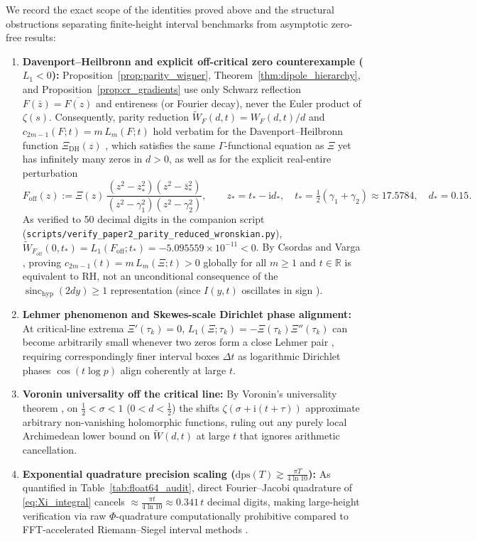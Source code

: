 \documentclass[11pt,a4paper,reqno]{amsart}
\theoremstyle{definition}
\theoremstyle{remark}
\numberwithin{equation}{section}
\newcommand{\ii}{\mathrm{i}}
\newcommand{\Wtil}{\widetilde{W}}
\newcommand{\sinch}{\operatorname{sinc}_{\mathrm{hyp}}}
\begin{document}
We record the exact scope of the identities proved above and the structural obstructions separating finite-height interval benchmarks from asymptotic zero-free results:
\begin{enumerate}
\item \textbf{Davenport--Heilbronn and explicit off-critical zero counterexample ($L_1 < 0$):}
Proposition~\ref{prop:parity_wigner}, Theorem~\ref{thm:dipole_hierarchy}, and Proposition~\ref{prop:cr_gradients} use only Schwarz reflection $F(\bar{z}) = \overline{F(z)}$ and entireness (or Fourier decay), never the Euler product of $\zeta(s)$. Consequently, parity reduction $\Wtil_F(d,t) = W_F(d,t)/d$ and $c_{2m-1}(F;t) = m\,L_m(F;t)$ hold verbatim for the Davenport--Heilbronn function $\Xi_{\mathrm{DH}}(z)$ \cite{DavenportHeilbronn1936}, which satisfies the same $\Gamma$-functional equation as $\Xi$ yet has infinitely many zeros in $d > 0$, as well as for the explicit real-entire perturbation
\[
F_{\mathrm{off}}(z) := \Xi(z)\,\frac{(z^2 - z_*^2)(z^2 - \bar{z}_*^2)}{(z^2 - \gamma_1^2)(z^2 - \gamma_2^2)}, \qquad z_* = t_* - \ii d_*, \quad t_* = \tfrac{1}{2}(\gamma_1 + \gamma_2) \approx 17.5784, \quad d_* = 0.15.
\]
As verified to 50 decimal digits in the companion script (\nolinkurl{scripts/verify_paper2_parity_reduced_wronskian.py}), $\Wtil_{F_{\mathrm{off}}}(0, t_*) = L_1(F_{\mathrm{off}}; t_*) = -5.095559 \times 10^{-11} < 0$. By Csordas and Varga \cite{CsordasVarga1990}, proving $c_{2m-1}(t) = m\,L_m(\Xi;t) > 0$ globally for all $m \ge 1$ and $t \in \mathbb{R}$ is equivalent to RH, not an unconditional consequence of the $\sinch(2dy) \ge 1$ representation (since $I(y,t)$ oscillates in sign \cite{Missiaen2026Paper1}).
\item \textbf{Lehmer phenomenon and Skewes-scale Dirichlet phase alignment:}
At critical-line extrema $\Xi'(\tau_k) = 0$, $L_1(\Xi;\tau_k) = -\Xi(\tau_k)\Xi''(\tau_k)$ can become arbitrarily small whenever two zeros form a close Lehmer pair \cite{Lehmer1956}, requiring correspondingly finer interval boxes $\Delta t$ as logarithmic Dirichlet phases $\cos(t\log p)$ align coherently at large $t$.
\item \textbf{Voronin universality off the critical line:}
By Voronin's universality theorem \cite{Voronin1975}, on $\frac{1}{2} < \sigma < 1$ ($0 < d < \frac{1}{2}$) the shifts $\zeta(\sigma + \ii(t+\tau))$ approximate arbitrary non-vanishing holomorphic functions, ruling out any purely local Archimedean lower bound on $\Wtil(d,t)$ at large $t$ that ignores arithmetic cancellation.
\item \textbf{Exponential quadrature precision scaling ($\mathrm{dps}(T) \gtrsim \frac{\pi T}{4\ln 10}$):}
As quantified in Table~\ref{tab:float64_audit}, direct Fourier--Jacobi quadrature of \eqref{eq:Xi_integral} cancels $\approx \frac{\pi t}{4\ln 10} \approx 0.341\,t$ decimal digits, making large-height verification via raw $\Phi$-quadrature computationally prohibitive compared to FFT-accelerated Riemann--Siegel interval methods \cite{Platt2017,PlattTrudgian2021}.
\end{enumerate}
\end{document}
